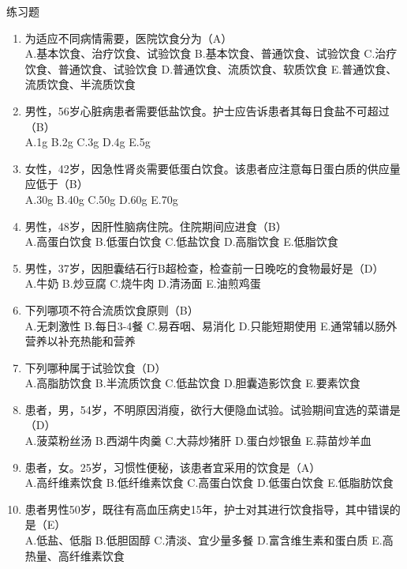 \documentclass[11pt, a4paper]{ctexart}
\begin{document}
\begin{examplebox}{练习题}
\begin{enumerate}
    \item 为适应不同病情需要，医院饮食分为（A）\\
    A.基本饮食、治疗饮食、试验饮食 \quad B.基本饮食、普通饮食、试验饮食 \quad C.治疗饮食、普通饮食、试验饮食 \quad D.普通饮食、流质饮食、软质饮食 \quad E.普通饮食、流质饮食、半流质饮食
    \item 男性，56岁心脏病患者需要低盐饮食。护士应告诉患者其每日食盐不可超过（B）\\
    A.1g \quad B.2g \quad C.3g \quad D.4g \quad E.5g
    \item 女性，42岁，因急性肾炎需要低蛋白饮食。该患者应注意每日蛋白质的供应量应低于（B）\\
    A.30g \quad B.40g \quad C.50g \quad D.60g \quad E.70g
    \item 男性，48岁，因肝性脑病住院。住院期间应进食（B）\\
    A.高蛋白饮食 \quad B.低蛋白饮食 \quad C.低盐饮食 \quad D.高脂饮食 \quad E.低脂饮食
    \item 男性，37岁，因胆囊结石行B超检查，检查前一日晚吃的食物最好是（D）\\
    A.牛奶 \quad B.炒豆腐 \quad C.烧牛肉 \quad D.清汤面 \quad E.油煎鸡蛋
    \item 下列哪项不符合流质饮食原则（B）\\
    A.无刺激性 \quad B.每日3-4餐 \quad C.易吞咽、易消化 \quad D.只能短期使用 \quad E.通常辅以肠外营养以补充热能和营养
    \item 下列哪种属于试验饮食（D）\\
    A.高脂肪饮食 \quad B.半流质饮食 \quad C.低盐饮食 \quad D.胆囊造影饮食 \quad E.要素饮食
    \item 患者，男，54岁，不明原因消瘦，欲行大便隐血试验。试验期间宜选的菜谱是（D）\\
    A.菠菜粉丝汤 \quad B.西湖牛肉羹 \quad C.大蒜炒猪肝 \quad D.蛋白炒银鱼 \quad E.蒜苗炒羊血
    \item 患者，女。25岁，习惯性便秘，该患者宜采用的饮食是（A）\\
    A.高纤维素饮食 \quad B.低纤维素饮食 \quad C.高蛋白饮食 \quad D.低蛋白饮食 \quad E.低脂肪饮食
    \item 患者男性50岁，既往有高血压病史15年，护士对其进行饮食指导，其中错误的是（E）\\
    A.低盐、低脂 \quad B.低胆固醇 \quad C.清淡、宜少量多餐 \quad D.富含维生素和蛋白质 \quad E.高热量、高纤维素饮食
\end{enumerate}
\end{examplebox}
\end{document}
